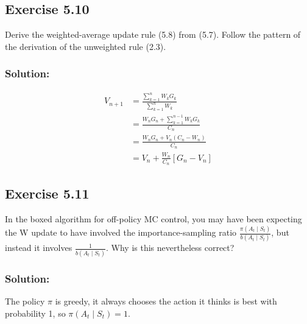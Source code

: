 \subsection*{Exercise 5.10}
Derive the weighted-average update rule (5.8) from (5.7). Follow the pattern of the derivation of the unweighted rule (2.3).

\subsubsection*{Solution:}

\begin{align*}
    V_{n+1} &= \frac{\sum_{k=1}^{n}W_k G_k}{\sum_{k=1}^{n}W_k} \\
    &= \frac{W_{n}G_{n} + \sum_{k=1}^{n-1}W_k G_k}{C_n} \\
    &= \frac{W_{n}G_{n} + V_{n}(C_{n}-W_n)}{C_{n}} \\
    &= V_n + \frac{W_n}{C_n}\left[ G_n - V_n\right]
\end{align*}


\subsection*{Exercise 5.11}
In the boxed algorithm for off-policy MC control, you may have been
expecting the W update to have involved the importance-sampling ratio $\frac{\pi(A_t \mid S_t)}{b(A_t \mid S_t)}$, but
instead it involves $\frac{1}{b(A_t \mid S_t)}$. Why is this nevertheless correct?

\subsubsection*{Solution:}

The policy $\pi$ is greedy, it always chooses the action it thinks is best with probability 1, so  $\pi(A_t \mid S_t) = 1$.


